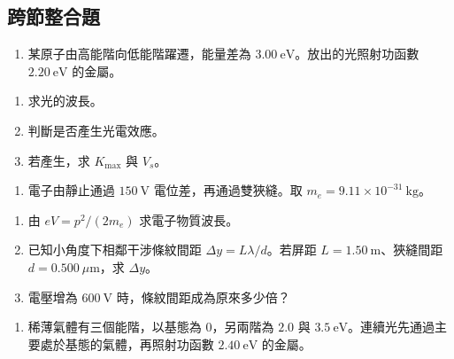 \documentclass[11pt,a4paper]{article}
\providecommand{\tightlist}{%
  \setlength{\itemsep}{0pt}\setlength{\parskip}{0pt}}
\begin{document}
\subsection{跨節整合題}\label{ux8de8ux7bc0ux6574ux5408ux984c}

\begin{enumerate}
\def\labelenumi{\arabic{enumi}.}
\setcounter{enumi}{12}
\tightlist
\item
  某原子由高能階向低能階躍遷，能量差為 \(3.00\ \mathrm{eV}\)。放出的光照射功函數 \(2.20\ \mathrm{eV}\) 的金屬。
\end{enumerate}

\begin{enumerate}
\def\labelenumi{(\arabic{enumi})}
\tightlist
\item
  求光的波長。\\
\item
  判斷是否產生光電效應。\\
\item
  若產生，求 \(K_{\max}\) 與 \(V_s\)。
\end{enumerate}

\begin{enumerate}
\def\labelenumi{\arabic{enumi}.}
\setcounter{enumi}{13}
\tightlist
\item
  電子由靜止通過 \(150\ \mathrm V\) 電位差，再通過雙狹縫。取 \(m_e=9.11\times10^{-31}\ \mathrm{kg}\)。
\end{enumerate}

\begin{enumerate}
\def\labelenumi{(\arabic{enumi})}
\tightlist
\item
  由 \(eV=p^2/(2m_e)\) 求電子物質波長。\\
\item
  已知小角度下相鄰干涉條紋間距 \(\Delta y=L\lambda/d\)。若屏距 \(L=1.50\ \mathrm m\)、狹縫間距 \(d=0.500\ \mu\mathrm m\)，求 \(\Delta y\)。\\
\item
  電壓增為 \(600\ \mathrm V\) 時，條紋間距成為原來多少倍？
\end{enumerate}

\begin{enumerate}
\def\labelenumi{\arabic{enumi}.}
\setcounter{enumi}{14}
\tightlist
\item
  稀薄氣體有三個能階，以基態為 \(0\)，另兩階為 \(2.0\) 與 \(3.5\ \mathrm{eV}\)。連續光先通過主要處於基態的氣體，再照射功函數 \(2.40\ \mathrm{eV}\) 的金屬。
\end{enumerate}
\end{document}
